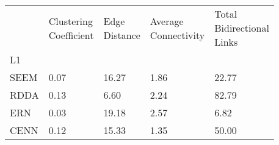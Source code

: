\footnotesize
\begin{tabular}{p{0.32in}p{0.55in}p{0.45in}p{0.65in}p{0.65in}}
 & \thead{Clustering\\Coefficient} & \thead{Edge\\Distance} & \thead{Average\\Connectivity} & \thead{Total\\Bidirectional\\Links} \\
L1 &  &  &  &  \\
SEEM & 0.07 & 16.27 & 1.86 & 22.77 \\
RDDA & 0.13 & 6.60 & 2.24 & 82.79 \\
ERN & 0.03 & 19.18 & 2.57 & 6.82 \\
CENN & 0.12 & 15.33 & 1.35 & 50.00 \\
\end{tabular}

% 